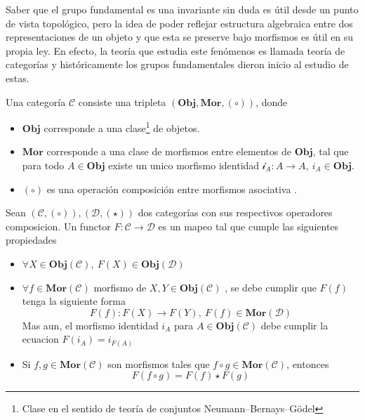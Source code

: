 {Saber que el grupo fundamental es una invariante sin duda es útil
desde un punto de vista topológico, pero la idea de poder reflejar
estructura algebraica entre dos representaciones de un objeto y que esta
se preserve bajo morfismos es útil en su propia ley. En efecto, la
teoría que estudia este fenómenos es llamada teoría de categorías y
históricamente los grupos fundamentales dieron inicio al estudio de
estas.
\begin{definicion}
  Una categoría \(\mathcal C\) consiste una tripleta \(( \mathbf {Obj},
  \mathbf {Mor}, (\circ))\), donde
  \begin{itemize}
    \item \(\mathbf {Obj}\) corresponde a una clase\footnote{Clase en el
      sentido de teoría de conjuntos Neumann–Bernays–Gödel} de objetos.
    \item \(\mathbf {Mor}\) corresponde a una clase de morfismos entre
      elementos de \(\mathbf {Obj}\), tal que para todo \(A \in
      \mathbf {Obj}\) existe un unico morfismo identidad \( \mathcal i
      _A : A \to A, \ i_A \in \mathbf{Obj}\).
    \item \((\circ)\) es una operación composición entre morfismos
      asociativa .
  \end{itemize}
\end{definicion}
\begin{definicion}
  Sean \(\left( \mathscr{C} , (\circ) \right), \left(\mathscr D ,
  (\star) \right) \) dos categorías con sus respectivos operadores
  composicion. Un functor \(F : \mathscr C \to \mathscr D\) es un mapeo
  tal que cumple las siguientes propiedades
  \begin{itemize}
  \item \(\forall X \in \mathbf{Obj}(\mathscr C),\ F(X) \in \mathbf{Obj} (\mathscr D)\)
  \item \(\forall f \in \mathbf{Mor} (\mathcal C)\) morfismo de \(X,Y
    \in \mathbf{Obj} (\mathcal C)\) , se
    debe cumplir que \(F (f)\) tenga la siguiente forma
    \[ F(f) : F(X) \to F(Y),\ F(f) \in \mathbf{Mor}
      (\mathcal D) \]
    Mas aun, el morfismo identidad \(i_A\) para \(A \in
    \mathbf{Obj} (\mathcal C)\) debe cumplir la ecuacion \(F (i_A) =
    i_{F(A)}\)
  \item Si \(f,g \in \mathbf{Mor}(\mathcal C)\) son morfismos tales que
    \(f \circ g \in \mathbf{Mor} (\mathcal C)\), entonces
    \[ F(f \circ g) = F(f) \star F(g) \]
  \end{itemize}
\end{definicion}
}
